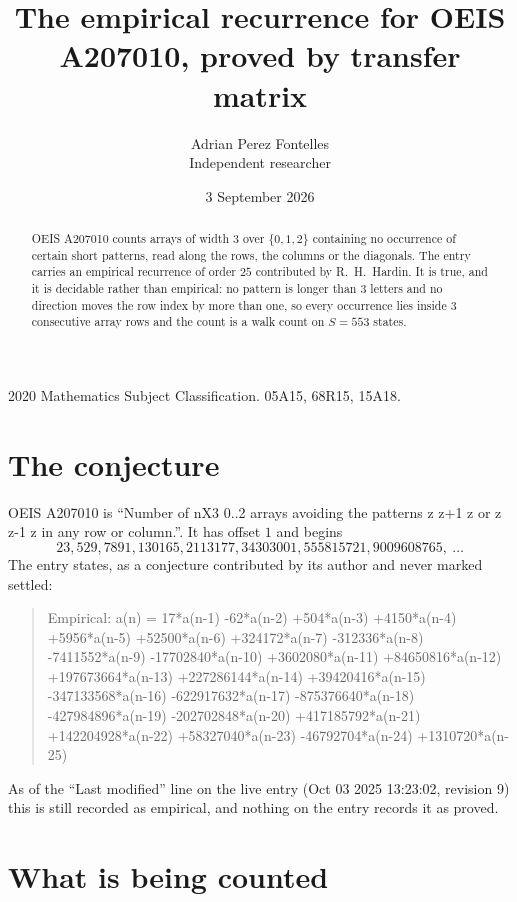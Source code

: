 \documentclass[11pt,a4paper]{article}
\title{The empirical recurrence for OEIS A207010, proved by transfer matrix}
\author{Adrian Perez Fontelles\\ \small Independent researcher}
\date{3 September 2026}
\theoremstyle{plain}
\theoremstyle{definition}
\begin{document}
\maketitle

\begin{abstract}
OEIS A207010 counts arrays of width $3$ over $\{0,1,2\}$ containing no occurrence of certain short
patterns, read along the rows, the columns or the diagonals. The entry carries an empirical
recurrence of order $25$ contributed by R.~H.~Hardin. It is true, and it is decidable
rather than empirical: no pattern is longer than $3$ letters and no direction moves the row
index by more than one, so every occurrence lies inside $3$ consecutive array rows and the
count is a walk count on $S=553$ states.
\end{abstract}

\noindent\small 2020 Mathematics Subject Classification. 05A15, 68R15, 15A18.\normalsize

\section{The conjecture}

OEIS A207010 is ``Number of nX3 0..2 arrays avoiding the patterns z z+1 z or z z-1 z in any row or column.''. It has offset $1$ and begins
\[
23, 529, 7891, 130165, 2113177, 34303001, 555815721, 9009608765,\ \dots
\]
The entry states, as a conjecture contributed by its author and never marked settled:
\begin{quote}
Empirical: a(n) = 17*a(n-1) -62*a(n-2) +504*a(n-3) +4150*a(n-4) +5956*a(n-5) +52500*a(n-6) +324172*a(n-7) -312336*a(n-8) -7411552*a(n-9) -17702840*a(n-10) +3602080*a(n-11) +84650816*a(n-12) +197673664*a(n-13) +227286144*a(n-14) +39420416*a(n-15) -347133568*a(n-16) -622917632*a(n-17) -875376640*a(n-18) -427984896*a(n-19) -202702848*a(n-20) +417185792*a(n-21) +142204928*a(n-22) +58327040*a(n-23) -46792704*a(n-24) +1310720*a(n-25)
\end{quote}
As of the ``Last modified'' line on the live entry (Oct 03 2025 13:23:02, revision 9) this is still
recorded as empirical, and nothing on the entry records it as proved.

\section{What is being counted}
\end{document}
